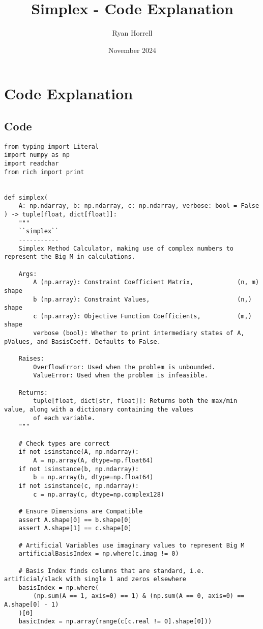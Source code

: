 \documentclass[letterpaper, a4paper]{article}
\title{Simplex - Code Explanation}
\author{Ryan Horrell}
\date{November 2024}
\begin{document}
\section{Code Explanation}

\subsection{Code}
\begingroup
\fontsize{8pt}{10pt}\selectfont
\begin{verbatim}
from typing import Literal
import numpy as np
import readchar
from rich import print


def simplex(
    A: np.ndarray, b: np.ndarray, c: np.ndarray, verbose: bool = False
) -> tuple[float, dict[float]]:
    """
    ``simplex``
    -----------
    Simplex Method Calculator, making use of complex numbers to represent the Big M in calculations.

    Args:
        A (np.array): Constraint Coefficient Matrix,            (n, m) shape
        b (np.array): Constraint Values,                        (n,) shape
        c (np.array): Objective Function Coefficients,          (m,) shape
        verbose (bool): Whether to print intermediary states of A, pValues, and BasisCoeff. Defaults to False.

    Raises:
        OverflowError: Used when the problem is unbounded.
        ValueError: Used when the problem is infeasible.

    Returns:
        tuple[float, dict[str, float]]: Returns both the max/min value, along with a dictionary containing the values
        of each variable.
    """

    # Check types are correct
    if not isinstance(A, np.ndarray):
        A = np.array(A, dtype=np.float64)
    if not isinstance(b, np.ndarray):
        b = np.array(b, dtype=np.float64)
    if not isinstance(c, np.ndarray):
        c = np.array(c, dtype=np.complex128)

    # Ensure Dimensions are Compatible
    assert A.shape[0] == b.shape[0]
    assert A.shape[1] == c.shape[0]

    # Artificial Variables use imaginary values to represent Big M
    artificialBasisIndex = np.where(c.imag != 0)

    # Basis Index finds columns that are standard, i.e. artificial/slack with single 1 and zeros elsewhere
    basisIndex = np.where(
        (np.sum(A == 1, axis=0) == 1) & (np.sum(A == 0, axis=0) == A.shape[0] - 1)
    )[0]
    basicIndex = np.array(range(c[c.real != 0].shape[0]))


\end{verbatim}
\end{document}
